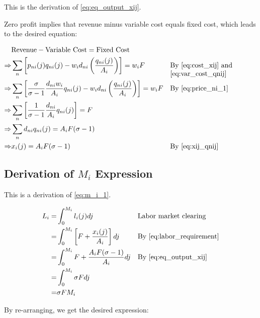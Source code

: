 \documentclass[10pt]{article}
\begin{document}
This is the derivation of \eqref{eq:eq_output_xij}.

Zero profit implies that 
revenue minus variable cost equals fixed cost,
which leads to the desired equation:

\begin{align}
    &\text{Revenue} - \text{Variable Cost} = \text{Fixed Cost} \\
    \Rightarrow & \sum_n \left[p_{ni}(j) q_{ni}(j) - w_i d_{ni} \left(\frac{q_{ni}(j)}{A_i}\right)\right] = w_i F && \parbox[t]{4cm}{\raggedright By \eqref{eq:cost_xij} and \eqref{eq:var_cost_qnij}} \\
    \Rightarrow & \sum_n \left[\frac{\sigma}{\sigma-1} \frac{d_{ni} w_i}{A_i} q_{ni}(j) - w_i d_{ni} \left(\frac{q_{ni}(j)}{A_i}\right)\right] = w_i F && \parbox[t]{4cm}{\raggedright By \eqref{eq:price_ni_1}} \\
    \Rightarrow & \sum_n \left[\frac{1}{\sigma-1} \frac{d_{ni}}{A_i} q_{ni}(j)\right] = F \\ 
    \Rightarrow & \sum_n d_{ni} q_{ni}(j) = A_i F (\sigma-1) \\
    \Rightarrow & x_i(j) = A_i F (\sigma-1) && \parbox[t]{4cm}{\raggedright By \eqref{eq:xij_qnij}}
\end{align}


\subsection{Derivation of $M_i$ Expression}
\label{sec:m_i_1}

This is a derivation of \eqref{eq:m_i_1}.

\begin{align}
    L_i = &\int_{0}^{M_i} l_i(j) dj && \parbox[t]{4cm}{\raggedright Labor market clearing}\\
    = & \int_{0}^{M_i} \left[F + \frac{x_i(j)}{A_i}\right] dj && \text{By \eqref{eq:labor_requirement}} \\
    = &\int_{0}^{M_i} F + \frac{A_i F (\sigma -1)}{A_i} dj && \text{By \eqref{eq:eq_output_xij}} \\
    = &\int_{0}^{M_i} \sigma F dj \\
    = & \sigma F M_i
\end{align}

By re-arranging, we get the desired expression:
\end{document}
